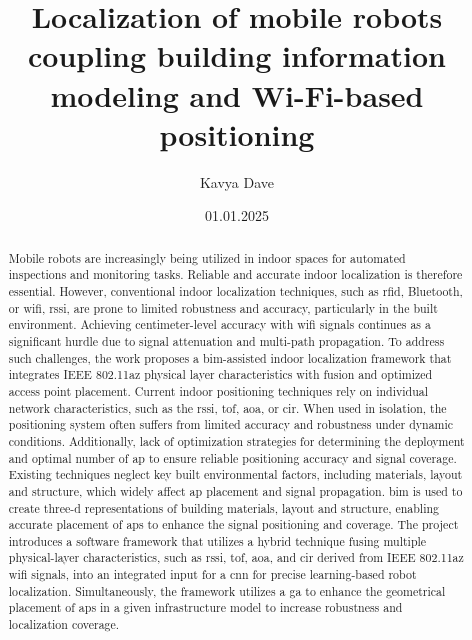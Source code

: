 \documentclass[colorlinks=true,linkcolor=blue]{thesisclass}
\title{Localization of mobile robots coupling building information modeling and Wi-Fi-based positioning}
\author{Kavya Dave}
\date{01.01.2025}
\theoremstyle{plain}
\begin{document}
\maketitle


\begin{abstract}
Mobile robots are increasingly being utilized in indoor spaces for automated inspections and monitoring tasks.
Reliable and accurate indoor localization is therefore essential. However, conventional indoor localization techniques, such as \gls{rfid}, Bluetooth, or \gls{wifi}, \gls{rssi}, are prone to limited robustness and accuracy, particularly in the built environment. Achieving centimeter-level accuracy with \acrshort{wifi} signals continues as a significant hurdle due to signal attenuation and multi-path propagation. To address such challenges, the work proposes a \gls{bim}-assisted indoor localization framework that integrates IEEE 802.11az physical layer characteristics with fusion and optimized access point placement.
Current indoor positioning techniques rely on individual network characteristics, such as the \acrshort{rssi}, \gls{tof}, \gls{aoa}, or \gls{cir}. When used in isolation, the positioning system often suffers from limited accuracy and robustness under dynamic conditions. Additionally, lack of optimization strategies for determining the deployment and optimal number of \gls{ap} to ensure reliable positioning accuracy and signal coverage. Existing techniques neglect key built environmental factors, including materials, layout and structure, which widely affect \acrshort{ap} placement and signal propagation.
\acrshort{bim} is used to create \gls{three-d} representations of building materials, layout and structure, enabling accurate placement of \acrshort{ap}s to enhance the signal positioning and coverage. The project introduces a software framework that utilizes a hybrid technique fusing multiple physical-layer characteristics, such as \acrshort{rssi}, \acrshort{tof}, \acrshort{aoa}, and \acrshort{cir} derived from IEEE 802.11az \acrshort{wifi} signals, into an integrated input for a \gls{cnn} for precise learning-based robot localization. Simultaneously, the framework utilizes a \gls{ga} to enhance the geometrical placement of \acrshort{ap}s in a given infrastructure model to increase robustness and localization coverage.

\end{abstract}
\end{document}
